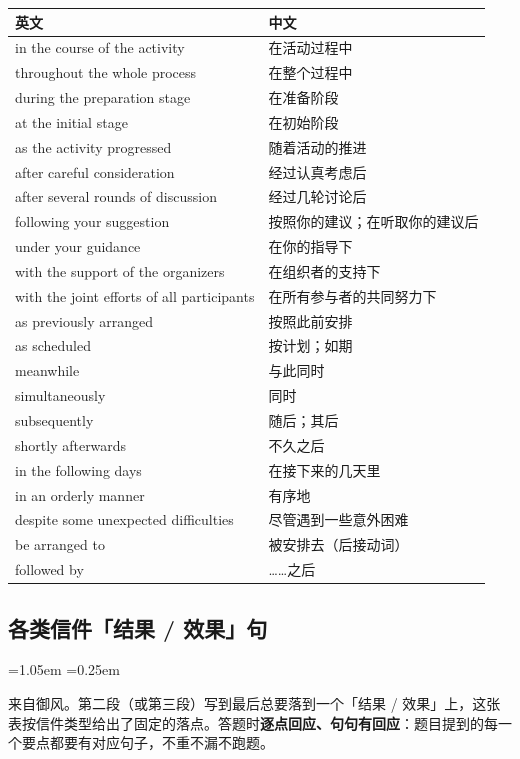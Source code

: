 \documentclass[11pt,a4paper]{ctexart}
\newenvironment{note}{%
  \par\addvspace{5pt}%
  \begin{list}{}{\leftmargin=1.05em \rightmargin=0.25em \listparindent=0pt
    \itemindent=0pt \topsep=0pt \parsep=2pt \itemsep=2pt \partopsep=0pt}%
  \item\relax\small\color{ink}%
}{%
  \end{list}\addvspace{5pt}%
}
\begin{document}
\begin{longtable}{L{9.4cm}L{6.6cm}}
\toprule
\textbf{英文} & \textbf{中文} \\
\midrule
\endhead
\bottomrule
\endlastfoot
in the course of the activity & 在活动过程中 \\
throughout the whole process & 在整个过程中 \\
during the preparation stage & 在准备阶段 \\
at the initial stage & 在初始阶段 \\
as the activity progressed & 随着活动的推进 \\
after careful consideration & 经过认真考虑后 \\
after several rounds of discussion & 经过几轮讨论后 \\
following your suggestion & 按照你的建议；在听取你的建议后 \\
under your guidance & 在你的指导下 \\
with the support of the organizers & 在组织者的支持下 \\
with the joint efforts of all participants & 在所有参与者的共同努力下 \\
as previously arranged & 按照此前安排 \\
as scheduled & 按计划；如期 \\
meanwhile & 与此同时 \\
simultaneously & 同时 \\
subsequently & 随后；其后 \\
shortly afterwards & 不久之后 \\
in the following days & 在接下来的几天里 \\
in an orderly manner & 有序地 \\
despite some unexpected difficulties & 尽管遇到一些意外困难 \\
be arranged to & 被安排去（后接动词） \\
followed by & ……之后 \\
\end{longtable}


\subsection{各类信件「结果 / 效果」句}

\begin{note}
来自御风。第二段（或第三段）写到最后总要落到一个「结果 / 效果」上，这张表按信件类型给出了固定的落点。答题时\textbf{逐点回应、句句有回应}：题目提到的每一个要点都要有对应句子，不重不漏不跑题。
\end{note}
\end{document}
